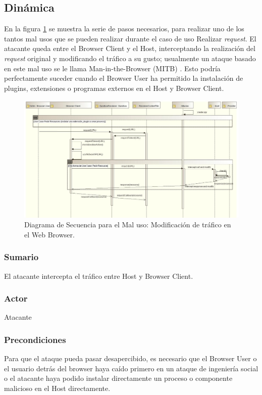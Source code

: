 \subsection{Dinámica}
En la figura \ref{fig:SeqMisuse} se muestra la serie de pasos necesarios, para realizar uno de los tantos mal usos que se pueden realizar durante el caso de uso Realizar \textit{request}. El atacante queda entre el Browser Client y el Host, interceptando la realización del \textit{request} original y modificando el tráfico a su gusto; usualmente un ataque basado en este mal uso se le llama Man-in-the-Browser (MITB) \cite{Liu2012, Barth2010, Utakrit2009, Dougan2012}. Esto podría perfectamente suceder cuando el Browser User ha permitido la instalación de plugins, extensiones o programas externos en el Host y Browser Client.
\begin{figure}[h!t]
	        \centering
	        \includegraphics[scale=0.45]{figures/chap5/patronMisuseSeq.jpg}
	        \caption{Diagrama de Secuencia para el Mal uso: Modificación de tráfico en el Web Browser.}
	        \label{fig:SeqMisuse}
    \end{figure}
	
	\subsubsection{Sumario} El atacante intercepta el tráfico entre Host y Browser Client.
	\subsubsection{Actor} Atacante
	\subsubsection{Precondiciones} Para que el ataque pueda pasar desapercibido, es necesario que el Browser User o el usuario detrás del browser haya caído primero en un ataque de ingeniería social o el atacante haya podido instalar directamente un proceso o componente malicioso en el Host directamente.
